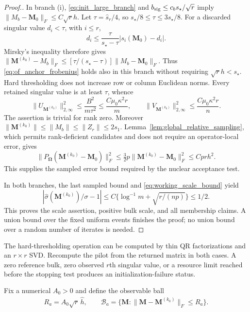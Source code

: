 \documentclass[numsec,webpdf,modern,large,namedate]{oup-authoring-template}
\theoremstyle{plain}
\theoremstyle{remark}
\newcommand{\M}{\bm{M}}
\newcommand{\bOmega}{\bm{\Omega}}
\newif\ifmarkchanges
\newenvironment{revision}{\begingroup\ifmarkchanges\color{red}\fi}{\endgroup}
\begin{document}
\begin{revision}
\begin{proof}[Proof.]
In branch (i), \eqref{eq:init_large_branch} and
$b_{\rm sig}\le c_bs_\star/\sqrt r$ imply
$\|M_b-\M_0\|_F\le C\sqrt r h$.
Let $\tau=\widehat s_r/4$, so $s_\star/8\le\tau\le3s_\star/8$.
For a discarded singular value $d_i<\tau$, with $i\le r$,
\[
 d_i\le\frac{\tau}{s_\star-\tau}
                   |s_i(\M_0)-d_i|.
\]
Mirsky's inequality therefore gives
$\|\M^{(k_0)}-M_b\|_F\le
[\tau/(s_\star-\tau)]\|M_b-\M_0\|_F$.
Thus \eqref{eq:of_anchor_frobenius} holds also in this branch without
requiring $\sqrt r h<s_\star$.
Hard thresholding does not increase row or column Euclidean norms.
Every retained singular value is at least $\tau$, whence
\[
 \|U_{\M^{(k_0)}}\|_{2,\infty}^2
 \le\frac{B^2}{m\tau^2}\le\frac{C\mu_0\kappa^2 r}{m},
 \qquad
 \|V_{\M^{(k_0)}}\|_{2,\infty}^2
 \le\frac{C\mu_0\kappa^2 r}{n}.
\]
The assertion is trivial for rank zero.  Moreover
$\|\M^{(k_0)}\|\le\|M_b\|\le\|Z_r\|\le2s_1$.
Lemma~\ref{lem:global_relative_sampling}, which permits rank-deficient candidates
and does not require an operator-local error, gives
\[
 \|P_{\bOmega}(\M^{(k_0)}-\M_0)\|_F^2
 \le\tfrac32p\|\M^{(k_0)}-\M_0\|_F^2\le Cprh^2.
\]
This supplies the sampled error bound required by the nuclear acceptance test.

In both branches, the last sampled bound and
\eqref{eq:working_scale_bound} yield
\[
 |\widehat\sigma(\M^{(k_0)})/\sigma-1|
 \le C\{\log^{-1}m+\sqrt{r/(np)}\}\le1/2.
\]
This proves the scale assertion, positive bulk scale, and all membership
claims.  A union bound over the fixed uniform events finishes the proof;
no union bound over a random number of iterates is needed.
\end{proof}


The hard-thresholding operation can be computed by thin QR
factorizations and an $r\times r$ SVD. Recompute the pilot from the
returned matrix in both cases. A zero reference bulk, zero observed
$r$th singular value, or a resource limit reached before the stopping
test produces an initialization-failure status.

Fix a numerical $A_0>0$ and define the observable ball
\begin{align}
 R_a=A_0\sqrt r\,\widehat h,\qquad
 \mathcal B_a=\{\M:\|\M-\M^{(k_0)}\|_F\le R_a\}.
 \label{eq:of_statistical_ball}
\end{align}



\end{revision}
\end{document}
